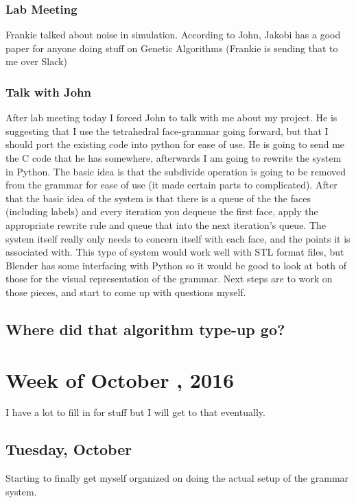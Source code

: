\documentclass[letterpaper,oneside,titlepage]{article}
\begin{document}
\subsubsection*{Lab Meeting}
Frankie talked about noise in simulation.  According to John, Jakobi has a good paper for anyone doing stuff on Genetic Algorithms (Frankie is sending that to me over Slack)
\subsubsection*{Talk with John}
After lab meeting today I forced John to talk with me about my project.	 He is suggesting that I use the tetrahedral face-grammar \cite{Rieffel:face-grammar} going forward, but that I should port the existing code into python for ease of use.  He is going to send me the C code that he has somewhere, afterwards I am going to rewrite the system in Python.  The basic idea is that the subdivide operation is going to be removed from the grammar for ease of use (it made certain parts to complicated).  After that the basic idea of the system is that there is a queue of the the faces (including labels) and every iteration you dequeue the first face, apply the appropriate rewrite rule and queue that into the next iteration's queue.  The system itself really only needs to concern itself with each face, and the points it is associated with.  This type of system would work well with STL format files, but Blender has some interfacing with Python so it would be good to look at both of those for the visual representation of the grammar.  Next steps are to work on those pieces, and start to come up with questions myself.

\subsection{Where did that algorithm type-up go?}


\section*{Week of October , 2016}
I have a lot to fill in for stuff but I will get to that eventually.

\subsection*{Tuesday, October }
Starting to finally get myself organized on doing the actual setup of the grammar system.
\end{document}
